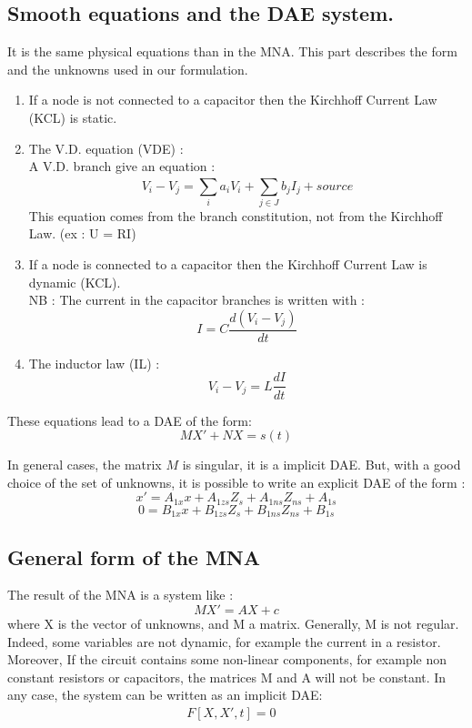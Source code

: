 \subsection{Smooth equations and the DAE system.}
It is the same physical equations than in the MNA. This part describes the form and the unknowns
used in our formulation.

\begin{enumerate} 
 \item If a node is not connected to a capacitor then the Kirchhoff Current Law (KCL) is static. \\
  \item The V.D. equation (VDE) : \\
    A V.D. branch give an equation :
    \[V_{i}-V_{j} = \sum_{i}^{}a_{i}V_{i} + \sum_{j\in J}^{}b_{j}I_{j} +   source\]
    This equation comes from the branch constitution, not from the Kirchhoff Law. (ex : U = RI)
  \item If a node is connected to a capacitor then the Kirchhoff Current Law is dynamic (KCL).\\
    NB : The current in the capacitor branches is written with :
    \[I = C\frac{d(V_{i} - V_{j})}{dt}\]
  \item The inductor law (IL) : 
     \[V_{i} - V_{j} = L\frac{dI}{dt}\]
\end{enumerate}

These equations lead to a DAE of the form:
\[MX'+NX=s(t)\]

In general cases, the matrix $M$ is singular, it is a implicit DAE. But, with a good choice of the set of unknowns, it is
possible to write an explicit DAE of the form :
\[x' = A_{1x}x +A_{1zs}Z_{s} + A_{1ns}Z_{ns}+A_{1s}\]
\[0  = B_{1x}x+B_{1zs}Z_{s} + B_{1ns}Z_{ns}+B_{1s}\]



\subsection{General form of the MNA}
The result of the MNA is a system like :
\[MX'=AX+c\]
where X is the vector of unknowns, and M a matrix. Generally, M is not regular. Indeed, some variables
are not dynamic, for example the current in a resistor.
Moreover, If the circuit contains some non-linear components, for example non constant resistors or capacitors,
the matrices M and A will not be constant. In any case, the system can be written as an implicit DAE:
\begin{eqnarray}
F[X,X',t]=0&\label{eq-mna-dae}
\end{eqnarray}

